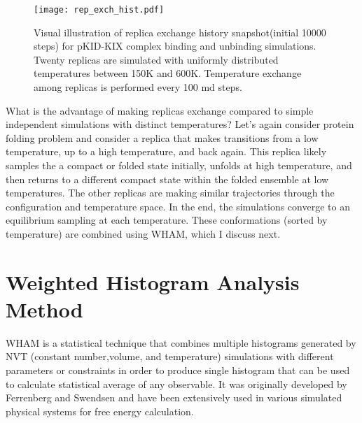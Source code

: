 \documentclass[../talant.diss.submit.tex]{subfiles}
\begin{document}
\begin{figure}[h!]
  \begin{centering}
    \texttt{[image: rep\_exch\_hist.pdf]}
    \caption{Visual illustration of replica exchange history snapshot(initial
      10000 steps) for pKID-KIX complex binding and unbinding simulations. Twenty replicas
      are simulated with uniformly distributed temperatures between 150K and 600K. Temperature
      exchange among replicas is performed every 100 md steps.}
    \label{fig:rep_exch_hist}
  \end{centering}                                                                                          
\end{figure}


What is the advantage of making replicas exchange compared to simple independent simulations
with distinct temperatures? Let's again consider protein folding problem and
consider a replica that makes transitions from a low temperature, up to a high temperature,
and back again. This replica likely samples the a compact or folded state initially, unfolds at
high temperature, and then returns to a different compact state within the folded ensemble at low
temperatures. The other replicas are making similar trajectories through the configuration and
temperature space.  In the end, the simulations converge to an equilibrium sampling at each temperature.
These conformations (sorted by temperature) are combined using WHAM, which I discuss next.


\section{\textbf{Weighted Histogram Analysis Method}}\label{sect:two_nine}

WHAM is a statistical technique that combines multiple histograms generated by
NVT (constant number,volume, and temperature) simulations with different
parameters or constraints in order to produce single histogram that can be used
to calculate statistical average of any observable.  It was originally developed
by Ferrenberg and Swendsen \cite{ferrenberg:88,ferrenberg:89} and have been
extensively used in various simulated physical systems for free energy
calculation.
\end{document}
